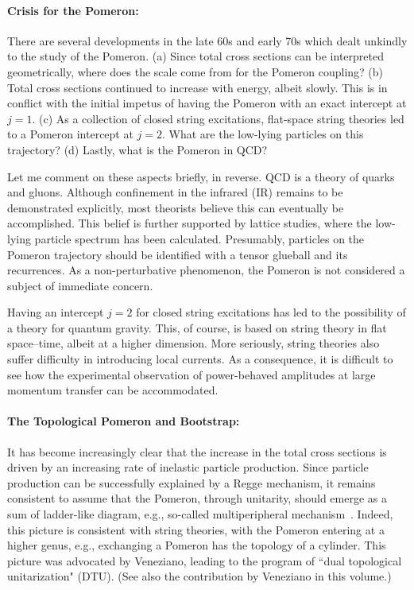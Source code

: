 \documentclass[11pt, oneside]{article}   	%
\newcommand{\<}{\langle}
\renewcommand{\>}{\rangle}
\numberwithin{equation}{section}
\numberwithin{figure}{section}
\begin{document}
\vspace{-2mm}


\paragraph{Crisis for the Pomeron:}

There are several developments in the late 60s and early 70s which dealt unkindly to the study of the Pomeron. (a) Since total cross sections can be interpreted geometrically, where does the scale come from for the Pomeron coupling?
 (b)  Total cross sections continued to increase with energy, albeit slowly. This is in conflict with the initial impetus of having the Pomeron with an exact intercept at $j=1$. (c) As a collection of closed string excitations\cite{GV68,SS}, flat-space string theories led to a Pomeron intercept at $j=2$.  What are the low-lying particles  on this trajectory? (d) Lastly, what is the Pomeron  in  QCD?  

Let me comment on these aspects briefly, in reverse. QCD is a theory of quarks and gluons. Although confinement in the infrared (IR) remains to be demonstrated explicitly, most theorists believe this can eventually be accomplished. This belief is further supported by lattice studies, where the low-lying particle spectrum has been calculated.  Presumably, particles on the Pomeron trajectory should be identified with a tensor glueball and its recurrences.  As a non-perturbative phenomenon, the Pomeron is not considered  a subject of immediate concern. 

Having an intercept $j=2$ for closed string excitations has led to the possibility of a theory for quantum gravity.  This, of course, is based on string theory in flat space--time, albeit at a higher dimension. More seriously,  string theories also suffer difficulty in introducing local currents. As a consequence, it is difficult to see how the experimental observation of power-behaved amplitudes at large momentum transfer can be accommodated. 


\paragraph{The Topological Pomeron and Bootstrap:} 
It has become increasingly clear that the increase in the total cross sections is driven by an increasing rate of inelastic particle production. Since particle production can be successfully explained by a Regge mechanism, it remains consistent to assume that the Pomeron, through unitarity, should emerge as a sum of ladder-like diagram, e.g., so-called multiperipheral mechanism~\cite{Chew:1969nn}. Indeed, this picture is consistent with string theories, with the Pomeron entering at a higher genus, e.g., exchanging a Pomeron has the topology of a cylinder.  This picture was advocated by Veneziano, leading to the program of ``dual topological unitarization"\cite{Veneziano:1971fp} (DTU). (See also the contribution by Veneziano in this volume.)
\end{document}
